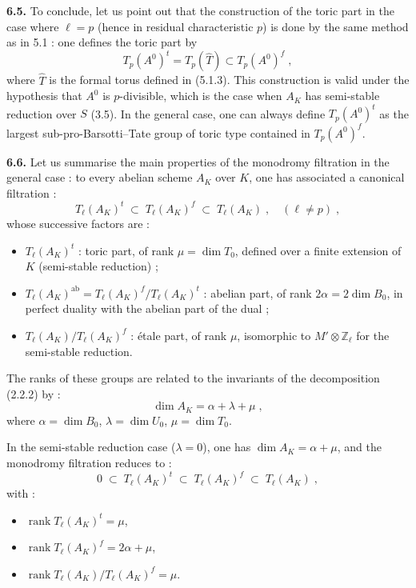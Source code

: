 \documentclass[11pt]{article}
\theoremstyle{plain}
\theoremstyle{definition}
\theoremstyle{remark}
\newcommand{\ZZ}{\mathbb Z}
\newcommand{\Tl}{T_\ell}
\newcommand{\Tp}{T_p}
\newcommand{\ab}{\mathrm{ab}}
\newcommand{\rang}{\operatorname{rank}}
\begin{document}
\medskip

\noindent\textbf{6.5.} To conclude, let us point out that the
construction of the toric part in the case where $\ell = p$ (hence in
residual characteristic $p$) is done by the same method as in 5.1 :
one defines the toric part by
\begin{equation}
\Tp(A^0)^t = \Tp(\hat{T}) \subset \Tp(A^0)^f \; ,
\end{equation}
where $\hat{T}$ is the formal torus defined in (5.1.3). This
construction is valid under the hypothesis that $A^0$ is
$p$-divisible, which is the case when $A_K$ has semi-stable reduction
over $S$ (3.5). In the general case, one can always define
$\Tp(A^0)^t$ as the largest sub-pro-Barsotti--Tate group of toric type
contained in $\Tp(A^0)^f$.

\medskip

\noindent\textbf{6.6.} Let us summarise the main properties of the
monodromy filtration in the general case : to every abelian scheme
$A_K$ over $K$, one has associated a canonical filtration :
\begin{equation}
\Tl(A_K)^t \;\subset\; \Tl(A_K)^f \;\subset\; \Tl(A_K) \; ,
\quad (\ell \neq p) \; ,
\end{equation}
whose successive factors are :
\begin{itemize}
\item $\Tl(A_K)^t$ : toric part, of rank $\mu = \dim T_0$, defined
over a finite extension of $K$ (semi-stable reduction) ;
\item $\Tl(A_K)^{\ab} = \Tl(A_K)^f/\Tl(A_K)^t$ : abelian part, of
rank $2\alpha = 2\dim B_0$, in perfect duality with the abelian part
of the dual ;
\item $\Tl(A_K)/\Tl(A_K)^f$ : \'etale part, of rank $\mu$, isomorphic
to $M' \otimes \ZZ_{\ell}$ for the semi-stable reduction.
\end{itemize}

\smallskip

The ranks of these groups are related to the invariants of the
decomposition (2.2.2) by :
\begin{equation}
\dim A_K = \alpha + \lambda + \mu \; ,
\end{equation}
where $\alpha = \dim B_0$, $\lambda = \dim U_0$, $\mu = \dim T_0$.

In the semi-stable reduction case ($\lambda = 0$), one has
$\dim A_K = \alpha + \mu$, and the monodromy filtration reduces to :
\begin{equation}
0 \;\subset\; \Tl(A_K)^t \;\subset\; \Tl(A_K)^f \;\subset\;
\Tl(A_K) \; ,
\end{equation}
with :
\begin{itemize}
\item $\rang \Tl(A_K)^t = \mu$,
\item $\rang \Tl(A_K)^f = 2\alpha + \mu$,
\item $\rang \Tl(A_K)/\Tl(A_K)^f = \mu$.
\end{itemize}

\clearpage
\end{document}
